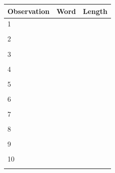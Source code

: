 \documentclass[
]{report}
\begin{document}
\begin{center}
\begin{tabular}{|l|p{3in}|p{1in}|} \hline
Observation & Word & Length  \\ \hline
1 & & \\ 
& & \\ \hline
2 & & \\ 
& & \\ \hline
3 & & \\ 
& & \\ \hline
4 & & \\ 
& & \\ \hline
5 & & \\ 
& & \\ \hline
6 & & \\ 
& & \\ \hline
7 & & \\
& & \\ \hline
8 & & \\ 
& & \\ \hline
9 & & \\ 
& & \\ \hline
10 & & \\ 
& & \\ \hline
\end{tabular}
\end{center}
\end{document}
